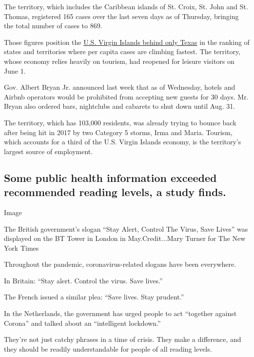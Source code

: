 The territory, which includes the Caribbean islands of St. Croix, St.
John and St. Thomas, registered 165 cases over the last seven days as of
Thursday, bringing the total number of cases to 869.

Those figures position the
\href{https://www.nytimes3xbfgragh.onion/interactive/2020/us/coronavirus-us-cases.html}{U.S.
Virgin Islands behind only Texas} in the ranking of states and
territories where per capita cases are climbing fastest. The territory,
whose economy relies heavily on tourism, had reopened for leisure
visitors on June 1.

Gov. Albert Bryan Jr. announced last week that as of Wednesday, hotels
and Airbnb operators would be prohibited from accepting new guests for
30 days. Mr. Bryan also ordered bars, nightclubs and cabarets to shut
down until Aug. 31.

The territory, which has 103,000 residents, was already trying to bounce
back after being hit in 2017 by two Category 5 storms, Irma and Maria.
Tourism, which accounts for a third of the U.S. Virgin Islands economy,
is the territory's largest source of employment.

\hypertarget{some-public-health-information-exceeded-recommended-reading-levels-a-study-finds}{%
\subsection{Some public health information exceeded recommended reading
levels, a study
finds.}\label{some-public-health-information-exceeded-recommended-reading-levels-a-study-finds}}

Image

The British government's slogan ``Stay Alert, Control The Virus, Save
Lives'' was displayed on the BT Tower in London in May.Credit...Mary
Turner for The New York Times

Throughout the pandemic, coronavirus-related slogans have been
everywhere.

In Britain: ``Stay alert. Control the virus. Save lives.''

The French issued a similar plea: ``Save lives. Stay prudent.''

In the Netherlands, the government has urged people to act ``together
against Corona'' and talked about an ``intelligent lockdown.''

They're not just catchy phrases in a time of crisis. They make a
difference, and they should be readily understandable for people of all
reading levels.

